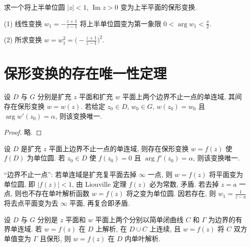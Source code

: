 \documentclass[theorem=false,mathfont=none,openany,sub3section]{easybook}
\begin{document}
\begin{example}
  求一个将上半单位圆 $|z|<1$, $\operatorname{Im}z>0$ 变为上半平面的保形变换.

  (1) 线性变换 $w_{1}=-\frac{z+1}{z-1}$ 将上半单位圆变为第一象限 $0<\arg w_{1}<\frac{\pi}{2}$.\par
  (2) 所求变换 $w=w_{1}^{2}=\bigl(-\frac{z+1}{z-1}\bigr)^{2}$.
\end{example}

\newpage

\section{保形变换的存在唯一性定理}

\begin{theorem}
  设 $D$ 与 $G$ 分别是扩充 $z$ 平面和扩充 $w$ 平面上两个边界不止一点的单连域, 其间存在保形变换 $w=w(z)$. 若给定 $z_{0}\in D$, $w_{0}\in G$, $w(z_{0})=w_{0}$ 且 $\arg w'(z_{0})=\alpha$, 则该变换唯一.
\end{theorem}

\begin{proof}
  略.
\end{proof}

\begin{corollary}
  设 $D$ 是扩充 $z$ 平面上边界不止一点的单连域, 则存在保形变换 $w=f(z)$ 使 $f(D)$ 为单位圆. 若 $z_{0}\in D$ 使 $f(z_{0})=0$ 且 $\arg f'(z_{0})=\alpha$, 则该变换唯一.
\end{corollary}

\begin{remark}
  ``边界不止一点'': 若单连域是扩充复平面去掉 $\infty$ 一点, 则 $w=f(z)$ 将平面变为单位圆,
  即 $|f(z)|<1$, 由 Liouville 定理 $f(z)$ 必为常数, 矛盾.
  若去掉 $z=a$ 一点, 则也不存在单叶解析函数 $w=f(z)$ 将之变为单位圆.
  因若存在, 则 $w_{1}=\frac{1}{z-a}$ 将去点平面变为去 $\infty$ 平面, 再复合即矛盾.
\end{remark}

\begin{theorem}
  设 $D$ 与 $G$ 分别是 $z$ 平面和 $w$ 平面上两个分别以简单闭曲线 $C$ 和 $\Gamma$ 为边界的有界单连域.
  若 $w=f(z)$ 在 $D$ 上解析, 在 $D\cup C$ 上连续, 且 $w=f(z)$ 将 $C$ 双方单值变为 $\Gamma$ 且保形,
  则 $w=f(z)$ 在 $D$ 内单叶解析.
\end{theorem}
\end{document}
